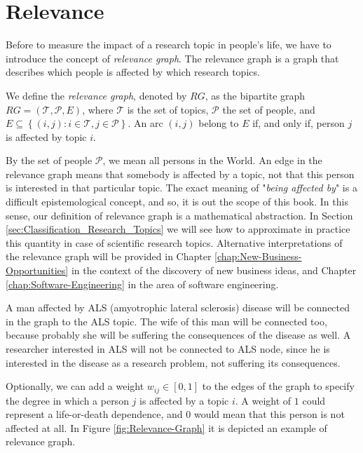 %
%

\section{Relevance}

Before to measure the impact of a research topic in people's life, we have to introduce the concept of \emph{relevance graph}. The relevance graph is a graph that describes which people is affected by which research topics.

\begin{definition}
\label{def:relevance-graph}
We define the \emph{relevance graph}, denoted by $RG$, as the bipartite graph $RG = (\mathcal{T},\mathcal{P},E)$, where $\mathcal{T}$ is the set of topics, $\mathcal{P}$ the set of people, and $E\subseteq\left\{ \left(i,j\right):i\in \mathcal{T},j\in \mathcal{P} \right\} $. An arc $(i, j)$ belong to $E$ if, and only if, person $j$ is affected by topic $i$.
\end{definition}

By the set of people $\mathcal{P}$, we mean all persons in the World. An edge in the relevance graph means that somebody is affected by a topic, not that this person is interested in that particular topic. The exact meaning of "\emph{being affected by}" is a difficult epistemological concept, and so, it is out the scope of this book. In this sense, our definition of relevance graph is a mathematical abstraction. In Section \ref{sec:Classification_Research_Topics} we will see how to approximate in practice this quantity in case of scientific research topics. Alternative interpretations of the relevance graph will be provided in Chapter \ref{chap:New-Business-Opportunities} in the context of the discovery of new business ideas, and Chapter \ref{chap:Software-Engineering} in the area of software engineering.

\begin{example}
A man affected by ALS (amyotrophic lateral sclerosis) disease will be connected in the graph to the ALS topic. The wife of this man will be connected too, because probably she will be suffering the consequences of the disease as well. A researcher interested in ALS will not be connected to ALS node, since he is interested in the disease as a research problem, not suffering its consequences.
\end{example}

Optionally, we can add a weight $w_{ij}\in\left[0,1\right]$ to the edges of the graph to specify the degree in which a person $j$ is affected by a topic $i$. A weight of $1$ could represent a life-or-death dependence, and $0$ would mean that this person is not affected at all. In Figure \ref{fig:Relevance-Graph} it is depicted an example of relevance graph. 


